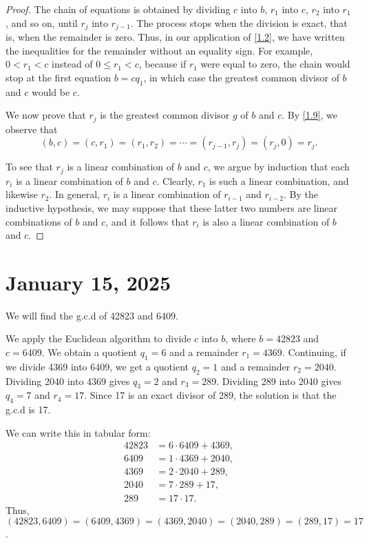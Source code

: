 \documentclass[11pt]{article}
\begin{document}
\begin{proof}
    The chain of equations is obtained by dividing \(c\) into \(b\), \(r_1\) into \(c\), \(r_2\) into \(r_1\), and so on, until \(r_j\) into \(r_{j-1}\). The process stops when the division is exact, that is, when the remainder is zero. Thus, in our application of \cref{1.2}, we have written the inequalities for the remainder without an equality sign. For example, \(0 < r_1 < c\) instead of \(0 \leq r_1 < c\), because if \(r_1\) were equal to zero, the chain would stop at the first equation \(b = cq_1\), in which case the greatest common divisor of \(b\) and \(c\) would be \(c\).

    We now prove that \(r_j\) is the greatest common divisor \(g\) of \(b\) and
    \(c\). By \cref{1.9}, we observe that
    \[
        (b, c) = (c, r_1) = (r_1, r_2) = \cdots = (r_{j-1}, r_j) = (r_j, 0) = r_j.
    \]

    To see that \(r_j\) is a linear combination of \(b\) and \(c\), we argue by
    induction that each \(r_i\) is a linear combination of \(b\) and \(c\).
    Clearly, \(r_1\) is such a linear combination, and likewise \(r_2\). In
    general, \(r_i\) is a linear combination of \(r_{i-1}\) and \(r_{i-2}\). By the
    inductive hypothesis, we may suppose that these latter two numbers are linear
    combinations of \(b\) and \(c\), and it follows that \(r_i\) is also a linear
    combination of \(b\) and \(c\).
\end{proof}

\section{January 15, 2025}
\begin{example}
    We will find the g.c.d of 42823 and 6409.
\end{example}
\begin{solution}

    We apply the Euclidean algorithm to divide \(c\) into \(b\), where \(b =
    42823\) and \(c = 6409\). We obtain a quotient \(q_1 = 6\) and a remainder
    \(r_1 = 4369\). Continuing, if we divide 4369 into 6409, we get a quotient
    \(q_2 = 1\) and a remainder \(r_2 = 2040\). Dividing 2040 into 4369 gives \(q_3
    = 2\) and \(r_3 = 289\). Dividing 289 into 2040 gives \(q_4 = 7\) and \(r_4 =
    17\). Since 17 is an exact divisor of 289, the solution is that the g.c.d is
    17.

    We can write this in tabular form:
    \[
        \begin{aligned}
            42823 & = 6 \cdot 6409 + 4369, \\
            6409  & = 1 \cdot 4369 + 2040, \\
            4369  & = 2 \cdot 2040 + 289,  \\
            2040  & = 7 \cdot 289 + 17,    \\
            289   & = 17 \cdot 17.
        \end{aligned}
    \]
    Thus, \((42823, 6409) = (6409, 4369) = (4369, 2040) = (2040, 289) = (289, 17) =
    17\).
\end{solution}
\end{document}

